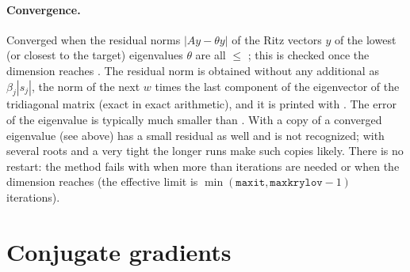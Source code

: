 \paragraph{Convergence.} Converged when the residual norms $|Ay-\theta y|$ of the Ritz vectors $y$ of the  lowest
(or closest to the target) eigenvalues $\theta$ are all $\le$ ; this is checked once the dimension reaches
. The residual norm is obtained without any additional  as $\beta_j|s_j|$, the norm of the next $w$
times the last component of the eigenvector of the tridiagonal matrix (exact in exact arithmetic), and it is printed with
. The error of the eigenvalue is typically much smaller than . With  a copy of a converged
eigenvalue (see above) has a small residual as well and is not recognized; with several roots and a very tight 
the longer runs make such copies likely. There is no restart:
the method fails with  when more than  iterations are needed or when the dimension reaches
 (the effective limit is $\min(\mathtt{maxit},\mathtt{maxkrylov}-1)$ iterations).

\section{Conjugate gradients}\label{sec:iterative:conjgrad}


